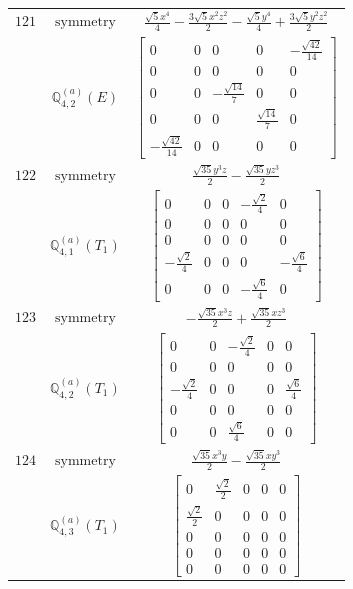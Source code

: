 \documentclass[fleqn,8pt,landscape]{jsarticle}
\begin{document}
\begin{longtable}{ccc}
$ 121 $ & $ \text{symmetry} $ & $ \frac{\sqrt{5} x^{4}}{4} - \frac{3 \sqrt{5} x^{2} z^{2}}{2} - \frac{\sqrt{5} y^{4}}{4} + \frac{3 \sqrt{5} y^{2} z^{2}}{2} $ \\
$  $ & $ \mathbb{Q}_{4,2}^{(a)}(E) $ & $ \begin{bmatrix} 0 & 0 & 0 & 0 & - \frac{\sqrt{42}}{14} \\ 0 & 0 & 0 & 0 & 0 \\ 0 & 0 & - \frac{\sqrt{14}}{7} & 0 & 0 \\ 0 & 0 & 0 & \frac{\sqrt{14}}{7} & 0 \\ - \frac{\sqrt{42}}{14} & 0 & 0 & 0 & 0 \end{bmatrix} $ \\ \hline
$ 122 $ & $ \text{symmetry} $ & $ \frac{\sqrt{35} y^{3} z}{2} - \frac{\sqrt{35} y z^{3}}{2} $ \\
$  $ & $ \mathbb{Q}_{4,1}^{(a)}(T_{1}) $ & $ \begin{bmatrix} 0 & 0 & 0 & - \frac{\sqrt{2}}{4} & 0 \\ 0 & 0 & 0 & 0 & 0 \\ 0 & 0 & 0 & 0 & 0 \\ - \frac{\sqrt{2}}{4} & 0 & 0 & 0 & - \frac{\sqrt{6}}{4} \\ 0 & 0 & 0 & - \frac{\sqrt{6}}{4} & 0 \end{bmatrix} $ \\ \hline
$ 123 $ & $ \text{symmetry} $ & $ - \frac{\sqrt{35} x^{3} z}{2} + \frac{\sqrt{35} x z^{3}}{2} $ \\
$  $ & $ \mathbb{Q}_{4,2}^{(a)}(T_{1}) $ & $ \begin{bmatrix} 0 & 0 & - \frac{\sqrt{2}}{4} & 0 & 0 \\ 0 & 0 & 0 & 0 & 0 \\ - \frac{\sqrt{2}}{4} & 0 & 0 & 0 & \frac{\sqrt{6}}{4} \\ 0 & 0 & 0 & 0 & 0 \\ 0 & 0 & \frac{\sqrt{6}}{4} & 0 & 0 \end{bmatrix} $ \\ \hline
$ 124 $ & $ \text{symmetry} $ & $ \frac{\sqrt{35} x^{3} y}{2} - \frac{\sqrt{35} x y^{3}}{2} $ \\
$  $ & $ \mathbb{Q}_{4,3}^{(a)}(T_{1}) $ & $ \begin{bmatrix} 0 & \frac{\sqrt{2}}{2} & 0 & 0 & 0 \\ \frac{\sqrt{2}}{2} & 0 & 0 & 0 & 0 \\ 0 & 0 & 0 & 0 & 0 \\ 0 & 0 & 0 & 0 & 0 \\ 0 & 0 & 0 & 0 & 0 \end{bmatrix} $ \\ \hline

\end{longtable}
\end{document}
